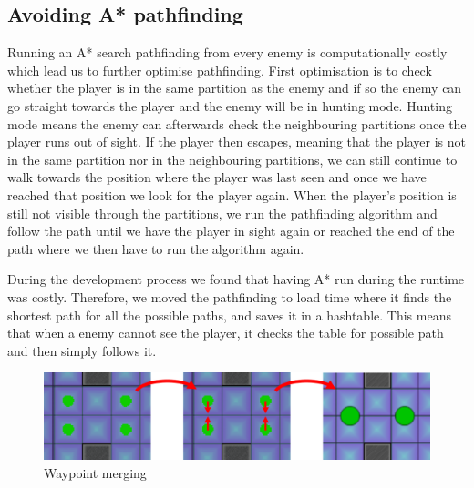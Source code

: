 \subsection*{Avoiding A* pathfinding}
Running an A* search pathfinding from every enemy is computationally costly which lead us to further optimise pathfinding.
First optimisation is to check whether the player is in the same partition as the enemy and if so the enemy can go straight towards the player and the enemy will be in hunting mode.
Hunting mode means the enemy can afterwards check the neighbouring partitions once the player runs out of sight.
If the player then escapes, meaning that the player is not in the same partition nor in the neighbouring partitions, we can still continue to walk towards the position where the player was last seen and once we have reached that position we look for the player again.
When the player's position is still not visible through the partitions, we run the pathfinding algorithm and follow the path until we have the player in sight again or reached the end of the path where we then have to run the algorithm again.

During the development process we found that having A* run during the runtime was costly.
Therefore, we moved the pathfinding to load time where it finds the shortest path for all the possible paths, and saves it in a hashtable.
This means that when a enemy cannot see the player, it checks the table for possible path and then simply follows it.


\begin{figure}[H]
	\includegraphics[width=\textwidth]{figures/astar/waypointMerge}
	\caption{Waypoint merging}
	\label{waypointMerge}
\end{figure}

